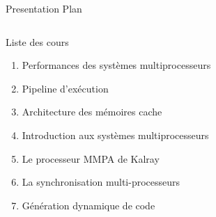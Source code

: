 %
\begin{Frame}{Presentation Plan}
  \begin{columns}[t]
    \begin{column}{8cm} %
      \begin{block}{Liste des cours}
        \begin{enumerate}
        \item Performances des systèmes multiprocesseurs
        \item Pipeline	d'exécution						
        \item Architecture des mémoires cache	
        \item Introduction aux systèmes multiprocesseurs
        \item Le processeur MMPA de Kalray
        \item La synchronisation multi-processeurs
        \item Génération dynamique de code			
        \end{enumerate}
      \end{block} 
    \end{column}
    
  \end{columns}  
\end{Frame}


